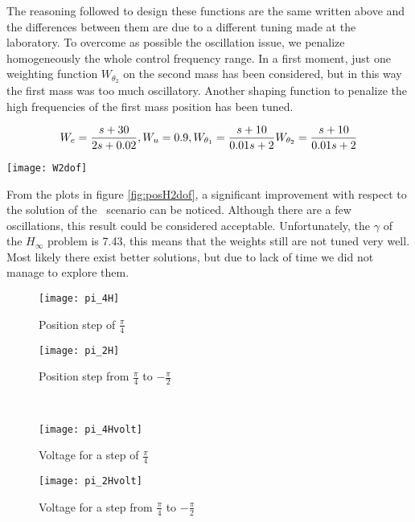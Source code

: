 The reasoning followed to design these functions are the same written above and the differences between them are due to a different tuning made at the laboratory. To overcome as possible the oscillation issue, we penalize homogeneously the whole control frequency range. In a first moment, just one weighting function $W_{\theta_{2}}$ on the second mass has been considered, but in this way the first mass was too much oscillatory. Another shaping function to penalize the high frequencies of the first mass position has been tuned.

\begin{equation}
	W_e=
	\frac{s+30}{2s+0.02}
	\\
	,
	\\
	W_u=0.9
	\\
	,
	\\
	W_{\theta_{1}}=
	\frac{s+10}{0.01s+2}
	\\
	W_{\theta_{2}}=
	\frac{s+10}{0.01s+2}
\end{equation}

\begin{figure*}[h]
	\centering
	\texttt{[image: W2dof]}
	\caption{Weighting functions}
\end{figure*}


From the plots in figure \ref{fig:posH2dof}, a significant improvement with respect to the solution of the \onedof\ scenario can be noticed. Although there are a few oscillations, this result could be considered acceptable. Unfortunately, the $\gamma$ of the $H_\infty$ problem is 7.43, this means that the weights still are not tuned very well. Most likely there exist better solutions, but due to lack of time we did not manage to explore them.

 \begin{figure*}[h]
	\centering
	\begin{subfigure}{0.5\columnwidth}
		\texttt{[image: pi\_4H]}
		\caption{Position step of $\frac{\pi}{4}$}
	\end{subfigure}
	\begin{subfigure}{0.45\columnwidth}
		\texttt{[image: pi\_2H]}
		\caption{Position step from $\frac{\pi}{4}$ to $-\frac{\pi}{2}$}
	\end{subfigure}
	\\
	\begin{subfigure}{0.5\columnwidth}
		\texttt{[image: pi\_4Hvolt]}
		\caption{Voltage for a step of $\frac{\pi}{4}$}
	\end{subfigure}
	\begin{subfigure}{0.45\columnwidth}
		\texttt{[image: pi\_2Hvolt]}
		\caption{Voltage for a step from $\frac{\pi}{4}$ to $-\frac{\pi}{2}$}
	\end{subfigure}
	\caption{Position steps response}
	\label{fig:posH2dof}
\end{figure*}




 


